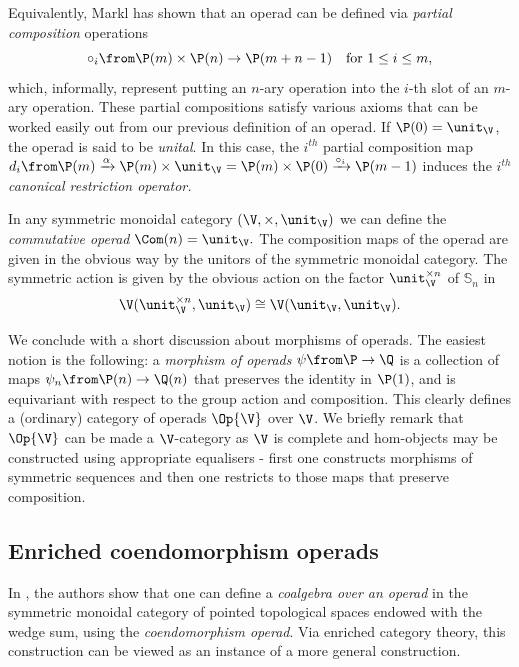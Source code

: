 \documentclass{tac}
\renewcommand{\S}{{\mathbb S}}
\begin{document}
\begin{remark}
\label{canonicalrestriction}
Equivalently, Markl has shown that an operad can be defined via \emph{partial composition} operations 
\begin{equation}
    \circ_i\from \P(m) \times \P(n) \to \P(m + n - 1) \quad \text{for } 1 \le i \le m,
\end{equation}
which, informally, represent putting an $n$-ary operation into the $i$-th slot of an $m$-ary operation. These partial compositions satisfy various axioms that can be worked easily out from our previous definition of an operad.
If $\P(0) = \unit_{\V}$, the operad is said to be \emph{unital}. In this case, the $i^{th}$ partial composition map  $d_i\from \P(m) \xrightarrow{\alpha} \P(m) \times \unit_{\V} =  \P(m) \times \P(0) \xrightarrow{\circ_i} \P(m-1)$ induces the \emph{$i^{th}$ canonical restriction operator.}
\end{remark}
\begin{example}
    In any symmetric monoidal category $(\V, \times, \unit_{\V})$ we can define the \emph{commutative operad} $\Com(n) = \unit_{\V}.$ The composition maps of the operad are given in the obvious way by the unitors of the symmetric monoidal category. The symmetric action is given by the obvious action on the factor $\unit_{\V}^{\times n}$ of $\S_n$ in
    $$
    \V(\unit_{\V}^{\times n}, \unit_{\V})\cong \V(\unit_{\V}, \unit_{\V}).
    $$
\end{example}
We conclude with a short discussion about morphisms of operads. The easiest notion is the following: a \emph{morphism of operads} $\psi \from \P \to \Q$ is a collection of maps $\psi_n \from \P(n) \to \Q(n)$ that preserves the identity in $\P(1)$, and is equivariant with respect to the group action and composition. This clearly defines a (ordinary) category of operads $\Op{\V}$ over $\V$. We briefly remark that $\Op{\V}$ can be made a $\V$-category as $\V$ is complete and hom-objects may be constructed using appropriate equalisers - first one constructs morphisms of symmetric sequences and then one restricts to those maps that preserve composition.
\subsection{Enriched coendomorphism operads}
 In \cite{me1}, the authors show that one can define a \textit{coalgebra over an operad} in the symmetric monoidal category of pointed topological spaces endowed with the wedge sum, using the \emph{coendomorphism operad}. Via enriched category theory, this construction can be viewed as an instance of a more general construction. 
 
\end{document}
